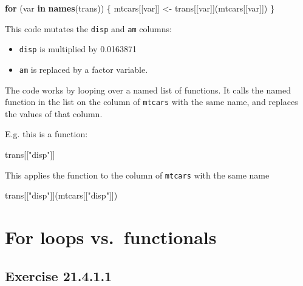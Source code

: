 \documentclass[]{book}
\newenvironment{Shaded}{\begin{snugshade}}{\end{snugshade}}
\newcommand{\ControlFlowTok}[1]{\textcolor[rgb]{0.13,0.29,0.53}{\textbf{#1}}}
\newcommand{\KeywordTok}[1]{\textcolor[rgb]{0.13,0.29,0.53}{\textbf{#1}}}
\newcommand{\NormalTok}[1]{#1}
\newcommand{\StringTok}[1]{\textcolor[rgb]{0.31,0.60,0.02}{#1}}
\providecommand{\tightlist}{%
  \setlength{\itemsep}{0pt}\setlength{\parskip}{0pt}}
\theoremstyle{plain}
\theoremstyle{remark}
\begin{document}
\begin{Shaded}
\begin{Highlighting}[]
\ControlFlowTok{for}\NormalTok{ (var }\ControlFlowTok{in} \KeywordTok{names}\NormalTok{(trans)) \{}
\NormalTok{  mtcars[[var]] <-}\StringTok{ }\NormalTok{trans[[var]](mtcars[[var]])}
\NormalTok{\}}
\end{Highlighting}
\end{Shaded}

This code mutates the \texttt{disp} and \texttt{am} columns:

\begin{itemize}
\tightlist
\item
  \texttt{disp} is multiplied by 0.0163871
\item
  \texttt{am} is replaced by a factor variable.
\end{itemize}

The code works by looping over a named list of functions.
It calls the named function in the list on the column of \texttt{mtcars} with the same name, and replaces the values of that column.

E.g. this is a function:

\begin{Shaded}
\begin{Highlighting}[]
\NormalTok{trans[[}\StringTok{"disp"}\NormalTok{]]}
\end{Highlighting}
\end{Shaded}

This applies the function to the column of \texttt{mtcars} with the same name

\begin{Shaded}
\begin{Highlighting}[]
\NormalTok{trans[[}\StringTok{"disp"}\NormalTok{]](mtcars[[}\StringTok{"disp"}\NormalTok{]])}
\end{Highlighting}
\end{Shaded}

\hypertarget{for-loops-vs.functionals}{%
\section{For loops vs.~functionals}\label{for-loops-vs.functionals}}

\hypertarget{exercise-21.4.1.1}{%
\subsection*{\texorpdfstring{Exercise {21.4.1.1}}{Exercise 21.4.1.1}}\label{exercise-21.4.1.1}}
\end{document}
